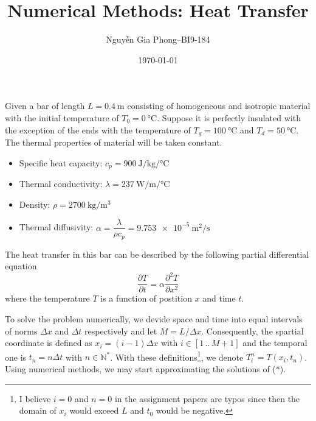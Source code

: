 \documentclass[a4paper,12pt]{article}
\title{Numerical Methods: Heat Transfer}
\author{Nguyễn Gia Phong--BI9-184}
\date{\dateenglish\today}
\newcommand{\sifrac}[2]{\displaystyle\SI[per-mode=fraction]{#1}{#2}}
\begin{document}
\maketitle

Given a bar of length $L = \SI{0.4}{\meter}$ consisting of homogeneous
and isotropic material with the initial temperature of $T_0 = \SI{0}{\celsius}$.
Suppose it is perfectly insulated with the exception of the ends with
the temperature of $T_g = \SI{100}{\celsius}$ and $T_d = \SI{50}{\celsius}$.
The thermal properties of material will be taken constant.
\begin{itemize}
  \item Specific heat capacity:
    $c_p = \sifrac{900}{\joule\per\kilogram\per\celsius}$
  \item Thermal conductivity:
    $\lambda = \sifrac{237}{\watt\per\meter\per\celsius}$
  \item Density:
    $\rho = \sifrac{2700}{\kilogram\per\cubic\meter}$
  \item Thermal diffusivity:
    $\alpha = \dfrac{\lambda}{\rho c_p}
            = \sifrac{9.753e-5}{\square\meter\per\second}$
\end{itemize}

The heat transfer in this bar can be described by the following
partial differential equation
\[\frac{\partial T}{\partial t}
  = \alpha\frac{\partial^2 T}{\partial x^2}\tag{$*$}\]
where the temperature $T$ is a function of postition $x$ and time $t$.

To solve the problem numerically, we devide space and time into equal intervals
of norms $\Delta x$ and $\Delta t$ respectively and let $M = L/\Delta x$.
Consequently, the spartial coordinate is defined as $x_i = (i - 1)\Delta x$
with $i \in [1\,..\,M + 1]$ and the temporal one is $t_n = n\Delta t$
with $n \in \mathbb N^*$. With these definitions\footnote{I believe $i = 0$
and $n = 0$ in the assignment papers are typos since then the domain of $x_i$
would exceed $L$ and $t_0$ would be negative.}, we denote $T_i^n = T(x_i, t_n)$.
Using numerical methods, we may start approximating the solutions of ($*$).
\end{document}
